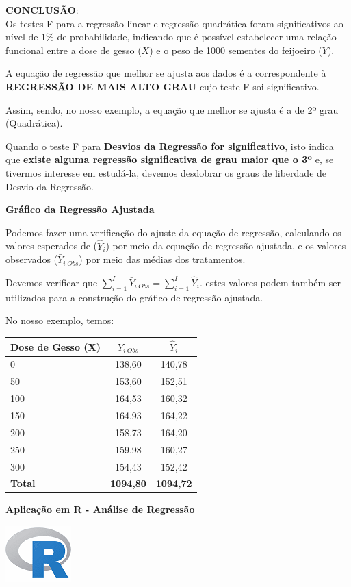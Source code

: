 \documentclass[
]{book}
\begin{document}
\textbf{CONCLUSÃO}:\\
Os testes F para a regressão linear e regressão quadrática foram significativos ao nível de \(1\%\) de probabilidade, indicando que é possível estabelecer uma relação funcional entre a dose de gesso (\(X\)) e o peso de 1000 sementes do feijoeiro (\(Y\)).

A equação de regressão que melhor se ajusta aos dados é a correspondente à \textbf{REGRESSÃO DE MAIS ALTO GRAU} cujo teste F soi significativo.

Assim, sendo, no nosso exemplo, a equação que melhor se ajusta é a de 2º grau (Quadrática).

Quando o teste F para \textbf{Desvios da Regressão for significativo}, isto indica que \textbf{existe alguma regressão significativa de grau maior que o 3º} e, se tivermos interesse em estudá-la, devemos desdobrar os graus de liberdade de Desvio da Regressão.

\textbf{Gráfico da Regressão Ajustada}

Podemos fazer uma verificação do ajuste da equação de regressão, calculando os valores esperados de (\(\hat{Y}_i\)) por meio da equação de regressão ajustada, e os valores observados (\(\bar{Y}_{i\;Obs}\)) por meio das médias dos tratamentos.

Devemos verificar que \(\sum_{i=1}^I\bar{Y}_{i~Obs}=\sum_{i=1}^I\hat{Y}_{i}\). estes valores podem também ser utilizados para a construção do gráfico de regressão ajustada.

No nosso exemplo, temos:

\begin{longtable}[]{@{}lcc@{}}
\toprule
Dose de Gesso (X) & \(\bar{Y}_{i~Obs}\) & \(\hat{Y}_i\)\tabularnewline
\midrule
\endhead
0 & 138,60 & 140,78\tabularnewline
50 & 153,60 & 152,51\tabularnewline
100 & 164,53 & 160,32\tabularnewline
150 & 164,93 & 164,22\tabularnewline
200 & 158,73 & 164,20\tabularnewline
250 & 159,98 & 160,27\tabularnewline
300 & 154,43 & 152,42\tabularnewline
\textbf{Total} & \textbf{1094,80} & \textbf{1094,72}\tabularnewline
\bottomrule
\end{longtable}

\textbf{Aplicação em R - Análise de Regressão}

\includegraphics{R.png}
\end{document}
